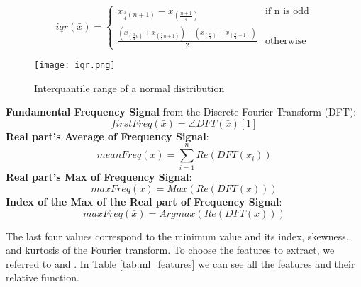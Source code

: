         \begin{equation}
            iqr(\bar{x}) =  
                \begin{cases} 
                \bar{x}_{\frac{3}{4}(n+1)} - \bar{x}_{(\frac{n+1}{4})} & \text{if n is odd} \\
                \frac{(\bar{x}_{(\frac{3}{4}n)} + \bar{x}_{(\frac{3}{4}n+1)}) - (\bar{x}_{(\frac{n}{4})} + \bar{x}_{(\frac{n}{4}+1)})}{2} & \text{otherwise}
                \end{cases}
        \end{equation}
        \begin{figure}[H]
            \centering
            \texttt{[image: iqr.png]}
            \caption{Interquantile range of a normal distribution}
            \label{fig:iqr}
        \end{figure}
\textbf{Fundamental Frequency Signal} from the Discrete Fourier Transform (DFT):
    \begin{equation}
        firstFreq(\bar{x}) = \angle DFT(\bar{x})[1]
    \end{equation}
\textbf{Real part's Average of Frequency Signal}:
    \begin{equation}
        meanFreq(\bar{x}) = \sum_{i=1}^{n} Re(DFT(x_i))
    \end{equation}
\textbf{Real part's Max of Frequency Signal}:
    \begin{equation}
        maxFreq(\bar{x}) = Max(Re(DFT(x)))
    \end{equation}
\textbf{Index of the Max of the Real part of Frequency Signal}:
    \begin{equation}
        maxFreq(\bar{x}) = Argmax(Re(DFT(x)))
    \end{equation}

The last four values correspond to the minimum value and its index, skewness, and kurtosis of the Fourier transform.
To choose the features to extract, we referred to \cite{oneto:2020} and \cite{sama:2010}.
In Table \ref{tab:ml_features} we can see all the features and their relative function.

